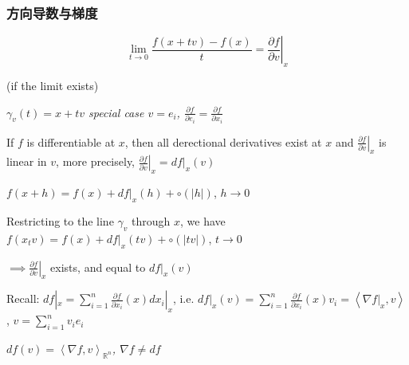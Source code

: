 \subsubsection{方向导数与梯度}

\begin{definition}
    $$\lim_{t\to0}\frac{f(x+tv)-f(x)}{t}=\left.\frac{\partial f}{\partial v}\right|_x$$

    (if the limit exists)
\end{definition}

\emph{$\gamma_v(t)=x+tv$ special case $v=e_i$, $\frac{\partial f}{\partial e_i}=\frac{\partial f}{\partial x_i}$}

\begin{proposition}
    If $f$ is differentiable at $x$, then all derectional derivatives exist at $x$ and $\left.\frac{\partial f}{\partial v}\right|_x$ is linear in $v$, more precisely, $\left.\frac{\partial f}{\partial v}\right|_x = df|_x(v)$
    \begin{pf}
        $f(x+h)=f(x)+df|_x(h)+\circ(|h|)$, $h\to0$

        Restricting to the line $\gamma_v$ through $x$, we have $f(x_tv)=f(x)+df|_x(tv)+\circ(|tv|)$, $t\to0$

        $\implies\left.\frac{\partial f}{\partial v}\right|_x$ exists, and equal to $df|_x(v)$
    \end{pf}
\end{proposition}

Recall: $df|_x=\sum_{i=1}^n\frac{\partial f}{\partial x_i}(x)dx_i|_x$, i.e. $df|_x(v)=\sum_{i=1}^n\frac{\partial f}{\partial x_i}(x)v_i=\left<\nabla f|_x,v\right>$, $v=\sum_{i=1}^nv_ie_i$

\emph{$df(v)=\left<\nabla f,v\right>_{\mathbb{R}^n}$, $\nabla f\neq df$}

